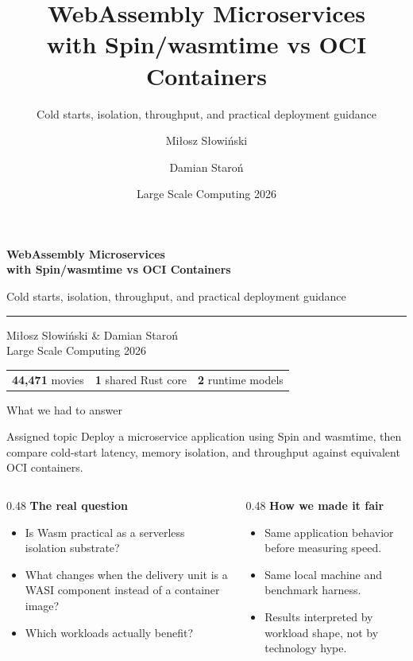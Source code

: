 \documentclass[aspectratio=169,10pt]{beamer}
\title{WebAssembly Microservices\\with Spin/wasmtime vs OCI Containers}
\subtitle{Cold starts, isolation, throughput, and practical deployment guidance}
\author{Miłosz Słowiński \and Damian Staroń}
\date{Large Scale Computing 2026}
\begin{document}
\begin{frame}[plain]
  \vspace{12mm}
  {\LARGE\bfseries WebAssembly Microservices\\[1.5mm]with Spin/wasmtime vs OCI Containers}

  \vspace{5mm}
  {\large Cold starts, isolation, throughput, and practical deployment guidance}

  \vspace{8mm}
  \rule{0.8\linewidth}{0.5pt}

  \vspace{6mm}
  {\small Miłosz Słowiński \& Damian Staroń}\\
  {\small Large Scale Computing 2026}

  \vfill
  \begin{tabular}{lll}
    \textbf{44,471} movies & \textbf{1} shared Rust core & \textbf{2} runtime models
  \end{tabular}
\end{frame}

\begin{frame}{What we had to answer}
  \begin{block}{Assigned topic}
    Deploy a microservice application using Spin and wasmtime, then compare cold-start latency, memory isolation, and throughput against equivalent OCI containers.
  \end{block}

  \vspace{3mm}
  \begin{columns}[T,onlytextwidth]
    \begin{column}{0.48\linewidth}
      \textbf{The real question}
      \begin{itemize}
        \item Is Wasm practical as a serverless isolation substrate?
        \item What changes when the delivery unit is a WASI component instead of a container image?
        \item Which workloads actually benefit?
      \end{itemize}
    \end{column}
    \begin{column}{0.48\linewidth}
      \textbf{How we made it fair}
      \begin{itemize}
        \item Same application behavior before measuring speed.
        \item Same local machine and benchmark harness.
        \item Results interpreted by workload shape, not by technology hype.
      \end{itemize}
    \end{column}
  \end{columns}
\end{frame}
\end{document}

